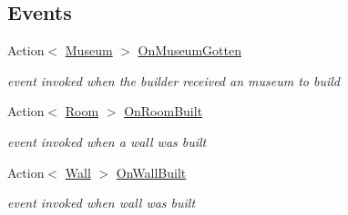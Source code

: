 \subsection*{Events}
\begin{DoxyCompactItemize}
\item 
Action$<$ \mbox{\hyperlink{class_museum}{Museum}} $>$ \mbox{\hyperlink{class_museum_builder_a6ffb727cee920d5caa79312decbc7c8d}{On\+Museum\+Gotten}}
\begin{DoxyCompactList}\small\item\em event invoked when the builder received an museum to build \end{DoxyCompactList}\item 
Action$<$ \mbox{\hyperlink{class_room}{Room}} $>$ \mbox{\hyperlink{class_museum_builder_a88929a7d394c22ace8a2d34638d14322}{On\+Room\+Built}}
\begin{DoxyCompactList}\small\item\em event invoked when a wall was built \end{DoxyCompactList}\item 
Action$<$ \mbox{\hyperlink{class_wall}{Wall}} $>$ \mbox{\hyperlink{class_museum_builder_a3076208732163cdad7068436b73a5d59}{On\+Wall\+Built}}
\begin{DoxyCompactList}\small\item\em event invoked when wall was built \end{DoxyCompactList}\end{DoxyCompactItemize}
